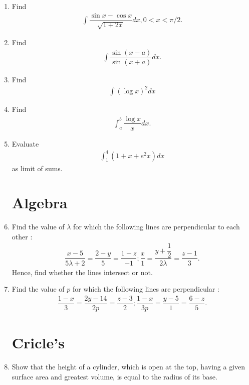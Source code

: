 \documentclass[12pt,-letter paper]{article}
\providecommand{\brak}[1]{\ensuremath{\left(#1\right)}}
\begin{document}
\begin{enumerate}
\item Find
\begin{align*}
    \int \dfrac{\sin x - \cos x}{\sqrt{1+2x}} dx , 0 < x < {\pi/2}.
    \end{align*}
    
    \item Find
    \begin{align*}
\int \dfrac{\sin \brak{x-a}}{\sin\brak{x+a}} dx.
    \end{align*}
    
\item Find 
\begin{align*}
    \int \brak{\log{x}}^2 dx
\end{align*}

\item Find
\begin{align*}
    \int_{a}^{b}\dfrac{\log{x}}{x}dx.
\end{align*}

\item Evaluate 
\begin{align*}
    \int_{1}^{4}\brak{1+x+e^2x}dx 
\end{align*}
as limit of sums.

\section{Algebra}

\item Find the value of $\lambda$ for which the following lines are perpendicular to each other :
\begin{align*}
    \dfrac{x-5}{5{\lambda+2}}=\dfrac{2-y}{5}=\dfrac{1-z}{-1};\dfrac{x}{1}=\dfrac{y+\dfrac{1}{2}}{2{\lambda}}=\dfrac{z-1}{3}.
\end{align*}
Hence, find whether the lines intersect or not.

\item Find the value of $p$ for which the following lines are perpendicular :
\begin{align*}
\dfrac{1-x}{3}= \dfrac{2y-14}{2p} = \dfrac{z-3}{2}; \dfrac{1-x}{3p} = \dfrac{y-5}{1} = \dfrac{6-z}{5}.
\end{align*}

\section{Cricle's}

\item Show that the height of a cylinder, which is open at the top, having a given surface area and greatest volume, is equal to the radius of its base.


\end{enumerate}
\end{document}
